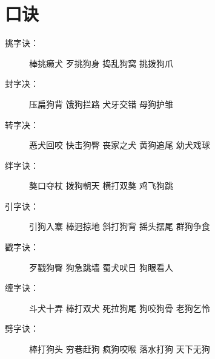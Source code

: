 \section{口诀}

\begin{description}
\item[挑字诀：] 棒挑癞犬 歹挑狗身 捣乱狗窝 挑拨狗爪
\item[封字决：] 压扁狗背 饿狗拦路 犬牙交错 母狗护雏 　　
\item[转字决：] 恶犬回咬 快击狗臀 丧家之犬 黄狗追尾 幼犬戏球 　　
\item[绊字诀：] 獒口夺杖 拨狗朝天 横打双獒 鸡飞狗跳 　　
\item[引字诀：] 引狗入寨 棒迥掠地 斜打狗背 摇头摆尾 群狗争食 　　
\item[戳字诀：] 歹戳狗臀 狗急跳墙 蜀犬吠日 狗眼看人 　　
\item[缠字诀：] 斗犬十弄 棒打双犬 死拉狗尾 狗咬狗骨 老狗乞怜 　　
\item[劈字诀：] 棒打狗头 穷巷赶狗 疯狗咬喉 落水打狗 天下无狗
\end{description}


